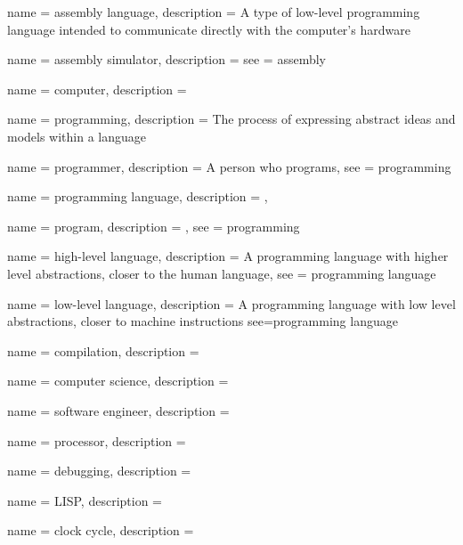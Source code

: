 \makeglossaries


 {
  name = {assembly language},
  description = {A type of low-level programming language intended to communicate directly with the computer's hardware}
}

 {
  name = {assembly simulator},
  description = {}
  see = {assembly}
}

 {
  name = {computer},
  description = {}
}

 {
  name = {programming},
  description = {The process of expressing abstract ideas and models within a language}
}

 {
  name = {programmer},
  description = {A person who programs},
  see = {programming}
}

 {
  name = {programming language},
  description = {},
}

 {
  name = {program},
  description = {},
  see = {programming}
}

 {
  name = {high-level language},
  description = {A programming language with higher level abstractions, closer to the human language},
  see = {programming language}
}

 {
  name = {low-level language},
  description = {A programming language with low level abstractions, closer to machine instructions}
  see={programming language}
}

 {
  name = {compilation},
  description = {}
}

 {
  name = {computer science},
  description = {}
}

 {
  name = {software engineer},
  description = {}
}

 {
  name = {processor},
  description = {}
}

 {
  name = {debugging},
  description = {}
}

 {
  name = {LISP},
  description = {}
}

 {
  name = {clock cycle},
  description = {}
}


